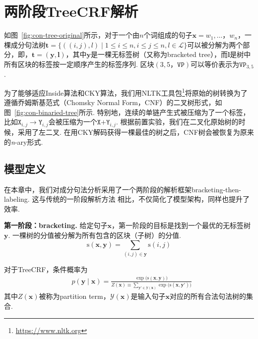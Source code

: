 \section{两阶段TreeCRF解析}\label{sec:2stage-parsing}

如图~\ref{fig:con-tree-original}所示，对于一个由$n$个词组成的句子$\boldsymbol{x}=w_1,\dots，w_{n}$，一棵成分句法树$\boldsymbol{t}=\{((i, j),l)\mid 1\le i \le n,i \le j \le n,l \in \mathcal{L}\}$可以被分解为两个部分，即，$\boldsymbol{t}=(\boldsymbol{y}, \boldsymbol{l})$，其中$\boldsymbol{y}$是一棵无标签树（又称为bracketed tree），而$\boldsymbol{l}$是树中所有区块的标签按一定顺序产生的标签序列.
区块$(3,5，\texttt{VP})$可以等价表示为$\texttt{VP}_{3,5}$.

为了能够适应Inside算法和CKY算法，我们用NLTK工具包\footnote{\url{https://www.nltk.org}}将原始的树转换为了遵循乔姆斯基范式（Chomsky Normal Form，CNF）的二叉树形式，如图~\ref{fig:con-binaried-tree}所示.
特别地，连续的单链产生式被压缩为了一个标签，比如$\texttt{X}_{i,j} \rightarrow \texttt{Y}_{i,j}$会被压缩为一个$\texttt{X+Y}_{i,j}$.
根据前置实验，我们在二叉化原始树的时候，采用了左二叉.
在用CKY解码获得一棵最佳的树之后，CNF树会被恢复为原来的\textit{n}-ary形式.

\subsection{模型定义}\label{sub@sec:con-crf-model-definition}

在本章中，我们对成分句法分析采用了一个两阶段的解析框架bracketing-then-labeling.
这与传统的一阶段解析方法 \citep{stern-etal-2017-minimal,gaddy-etal-2018-whats}相比，不仅简化了模型架构，同样也提升了效率.

\noindent\textbf{第一阶段：bracketing.}
给定句子$\boldsymbol{x}$，第一阶段的目标是找到一个最优的无标签树$\boldsymbol{y}$.
一棵树的分值被分解为所有包含的区块（子树）的分值.
\begin{equation} \label{eq:tree-score}
  \mathrm{s}(\boldsymbol{x},\boldsymbol{y}) = \sum\limits_{(i,j)\in \boldsymbol{y}}\mathrm{s}(i,j)
\end{equation}

对于TreeCRF，条件概率为
\begin{equation}\label{eq:tree-prob}
  \begin{split}
    & p(\boldsymbol{y}\mid\boldsymbol{x})  = \frac{\exp({\mathrm{s}(\boldsymbol{x},\boldsymbol{y}))}}{Z(\boldsymbol{x}) \equiv \sum\limits_{\boldsymbol{y'} \in \mathcal{Y}(\boldsymbol{x})} {\exp({\mathrm{s}(\boldsymbol{x},\boldsymbol{y'}))}}}
  \end{split}
\end{equation}
其中$Z(\boldsymbol{x})$被称为partition term，$\mathcal{Y}(\boldsymbol{x})$是输入句子$\boldsymbol{x}$对应的所有合法句法树的集合.

